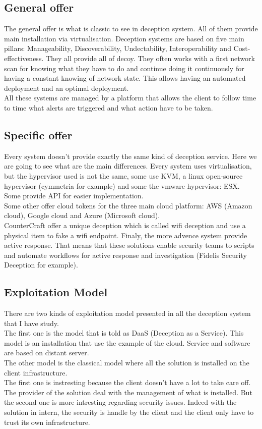 \documentclass{tnreport}
\begin{document}
\subsection{General offer}
The general offer is what is classic to see in deception system. All of them provide main installation via virtualisation.
Deception systems are based on five main pillars: Manageability, Discoverability, Undectability, Interoperability and Cost-effectiveness. They all provide all of decoy. They often works with a first network scan for knowing what they have to do and continue doing it continuously for having a constant knowing of network state. This allows having an automated deployment and an optimal deployment.\\
All these systems are managed by a platform that allows the client to follow time to time what alerts are triggered and what action have to be taken. 



\subsection{Specific offer}
Every system doesn't provide exactly the same kind of deception service. Here we are going to see what are the main differences.
Every system uses virtualisation, but the hypervisor used is not the same, some use KVM, a linux open-source hypervisor (cymmetria for example) and some the vmware hypervisor: ESX.\\
Some provide API for easier implementation.\\
Some other offer cloud tokens for the three main cloud platform:  AWS (Amazon cloud), Google cloud and Azure (Microsoft cloud).\\
CounterCraft offer a unique deception which is called wifi deception and use a physical item to fake a wifi endpoint.
Finaly, the more advence system provide active response. That means that these solutions enable security teams to scripts and automate workflows for active response and investigation (Fidelis Security Deception for example).



\subsection{Exploitation Model}
There are two kinds of exploitation model presented in all the deception system that I have study.\\
The first one is the model that is told as DaaS (Deception as a Service). This model is an installation that use the example of the cloud. Service and software are based on distant server.\\
The other model is the classical model where all the solution is installed on the client infrastructure.\\
The first one is instresting because the client doesn't have a lot to take care off. The provider of the solution deal with the management of what is installed. But the second one is more intresting regarding security issues. Indeed with the solution in intern, the security is handle by the client and the client only have to trust its own infrastructure.  
\end{document}

